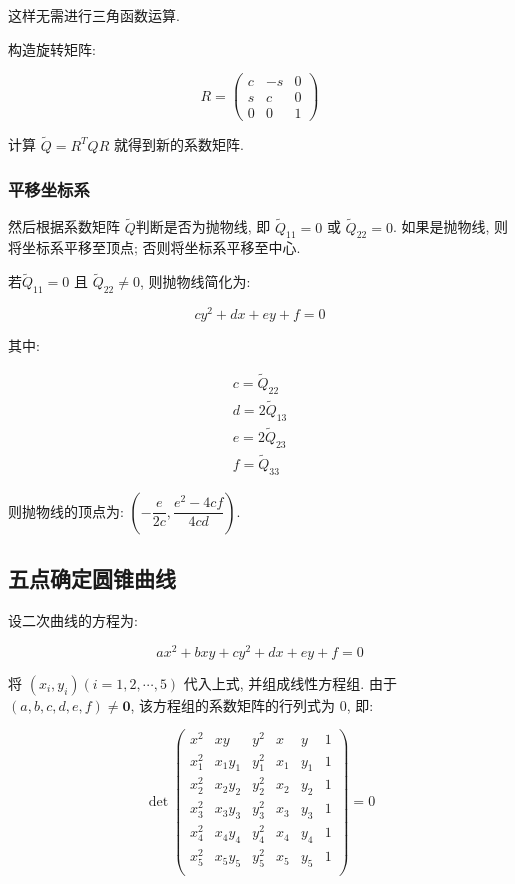 这样无需进行三角函数运算.

构造旋转矩阵:

\[
  R =
  \begin{pmatrix}
    c & -s & 0\\
    s & c & 0\\
    0 & 0 & 1
  \end{pmatrix}
\]

计算 $\tilde{Q}=R^TQR$ 就得到新的系数矩阵.

\subsubsection{平移坐标系}

然后根据系数矩阵 $\tilde{Q}$判断是否为抛物线, 即 $\tilde{Q}_{11} = 0$ 或 $\tilde{Q}_{22} = 0$. 如果是抛物线,
则将坐标系平移至顶点; 否则将坐标系平移至中心.

若$\tilde{Q}_{11} = 0$ 且 $\tilde{Q}_{22} \neq 0$, 则抛物线简化为:

\[
  cy^2+dx+ey+f=0
\] 

其中:

\begin{gather*}
  c = \tilde{Q}_{22}\\
  d = 2\tilde{Q}_{13}\\
  e = 2\tilde{Q}_{23}\\
  f = \tilde{Q}_{33}
\end{gather*}

则抛物线的顶点为: $\left(-\dfrac{e}{2c},\dfrac{e^2-4cf}{4cd}\right)$.


\subsection{五点确定圆锥曲线}

设二次曲线的方程为:

\[
  ax^2 + bxy + cy^2 + dx + ey + f = 0
\]

将 $(x_i,y_i) (i=1,2,\cdots,5)$ 代入上式, 并组成线性方程组.
由于 $(a, b, c, d, e, f) \neq \mathbf{0}$, 该方程组的系数矩阵的行列式为 0, 即:

\[
\det \begin{pmatrix}
x^2 & xy & y^2 & x & y & 1 \\
x^2_1 & x_1y_1 & y^2_1 & x_1 & y_1 & 1 \\
x^2_2 & x_2y_2 & y^2_2 & x_2 & y_2 & 1 \\
x^2_3 & x_3y_3 & y^2_3 & x_3 & y_3 & 1 \\
x^2_4 & x_4y_4 & y^2_4 & x_4 & y_4 & 1 \\
x^2_5 & x_5y_5 & y^2_5 & x_5 & y_5 & 1 \\
\end{pmatrix} = 0
\]

